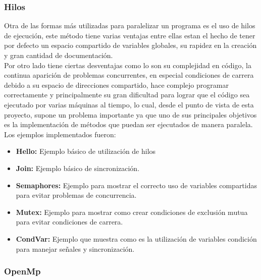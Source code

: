 \documentclass{article}
\begin{document}
\subsubsection{Hilos}

Otra de las formas más utilizadas para paralelizar un programa
es el uso de hilos de ejecución, este método tiene varias
ventajas entre ellas estan el hecho de tener por defecto un
espacio compartido de variables globales, su rapidez en la
creación y gran cantidad de documentación.\\

Por otro lado tiene ciertas desventajas como lo son su
complejidad en código, la continua aparición de problemas
concurrentes, en especial condiciones de carrera debido a su
espacio de direcciones compartido, hace complejo programar
correctamente y principalmente su gran dificultad para lograr
que el código sea ejecutado por varias máquinas al tiempo, lo
cual, desde el punto de vista de esta proyecto, supone un
problema importante ya que uno de sus principales objetivos es
la implementación de métodos que puedan ser ejecutados de
manera paralela.\\

Los ejemplos implementados fueron:

\begin{itemize}
    \item \textbf{Hello:} Ejemplo básico de utilización de hilos

    \item \textbf{Join:} Ejemplo básico de sincronización.

    \item \textbf{Semaphores:} Ejemplo para mostrar el correcto
        uso de variables compartidas para evitar problemas de
        concurrencia.

    \item \textbf{Mutex:} Ejemplo para mostrar como crear
        condiciones de exclusión mutua para evitar condiciones
        de carrera.

    \item \textbf{CondVar:} Ejemplo que muestra como es la
        utilización de variables condición para manejar señales
        y sincronización.
\end{itemize}

\subsubsection{OpenMp}
\end{document}
